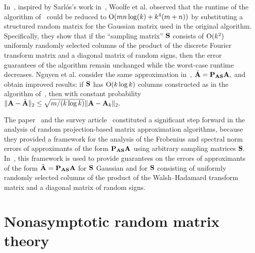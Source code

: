 In~\cite{WLRT08}, inspired by Sarl\'os's work in~\cite{Sar06}, Woolfe et al. observed 
that the runtime of the algorithm of~\cite{MRT06,MRT11}
could be reduced to $\mathrm{O}(mn \log(k) + k^4(m + n))$ by substituting a structured random
matrix for the Gaussian matrix used in the original algorithm. Specifically, they show that if 
the ``sampling matrix'' $\mathbf{S}$ consists of $\mathrm{O}(k^2)$ uniformly randomly selected columns of the product
of the discrete Fourier transform matrix and a diagonal matrix of random signs, then the error guarantees
of the algorithm remain unchanged while the worst-case runtime decreases. Nguyen et al. consider 
the same approximation in~\cite{NDT09}, $\tilde{\mathbf{A}} = \mathbf{P}_{\mathbf{A} \mathbf{S}} \mathbf{A},$ 
and obtain improved results: if $\mathbf{S}$ has $\mathrm{O}(k \log k)$ columns constructed as in the algorithm of~\cite{WLRT08},
then with constant probability $\|\mathbf{A} - \tilde{\mathbf{A}}\|_2 \leq \sqrt{m/(k\log k)} \|\mathbf{A} - \mathbf{A}_k\|_2.$ 

The paper~\cite{BDM11a} and the survey article~\cite{HMT11} constituted a significant step forward in the 
analysis of random projection-based matrix approximation algorithms, because they provided a framework for the 
analysis of the Frobenius and spectral norm errors of approximants of the form $\mathbf{P}_{\mathbf{A}\mathbf{S}} \mathbf{A}$ 
using arbitrary sampling matrices $\mathbf{S}.$ In~\cite{HMT11}, this framework is used to provide guarantees
on the errors of approximants of the form $\tilde{\mathbf{A}} = \mathbf{P}_{\mathbf{A} \mathbf{S}} \mathbf{A}$ for $\mathbf{S}$ Gaussian
and for $\mathbf{S}$ consisting of uniformly randomly selected columns of the product of the Walsh--Hadamard 
transform matrix and a diagonal matrix of random signs.

\section{Nonasymptotic random matrix theory}


